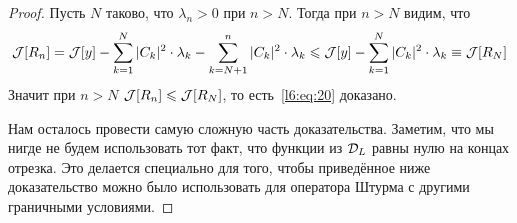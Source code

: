 \begin{proof}
	\noindent Пусть $N$ таково, что $\lambda_n>0$ при $n>N$. Тогда при $n>N$ видим, что 
	\begin{equation*}
		\hfill\J[R_n]=\J[y]-\sum\limits_{k=1}^{N}|C_k|^2\cdot\lambda_k-\sum\limits_{k=N+1}^{n}|C_k|^2\cdot\lambda_k\leqslant\J[y]-\sum\limits_{k=1}^{N}|C_k|^2\cdot\lambda_k\equiv\J[R_N]\hfill
	\end{equation*} 
	Значит при $n>N$ $\mathcal{J}[R_n]\leqslant\mathcal{J}[R_N]$, то есть~\eqref{l6:eq:20} доказано.
	
	Нам осталось провести самую сложную часть доказательства. Заметим, что мы нигде не будем использовать тот факт, что функции из $\mathcal{D}_L$ равны нулю на концах отрезка. Это делается специально для того, чтобы приведённое ниже доказательство можно было использовать для оператора Штурма с другими граничными условиями. 
	

\end{proof}
